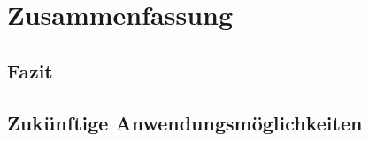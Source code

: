 \section{Zusammenfassung}
\label{sec:Zusammenfassung}

\subsection{Fazit}
\label{sub:Fazit}


\subsection{Zukünftige Anwendungsmöglichkeiten}
\label{sub:Zukünftige Anwendungsmöglichkeiten}

